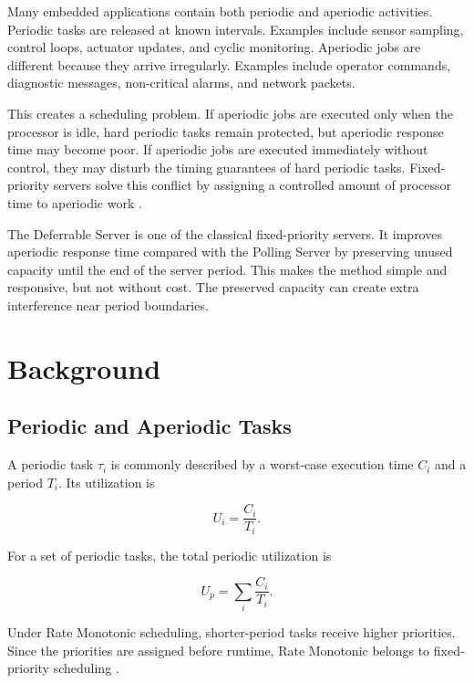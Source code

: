 \documentclass[conference]{IEEEtran}
\begin{document}
	Many embedded applications contain both periodic and aperiodic activities. Periodic tasks are released at known intervals. Examples include sensor sampling, control loops, actuator updates, and cyclic monitoring. Aperiodic jobs are different because they arrive irregularly. Examples include operator commands, diagnostic messages, non-critical alarms, and network packets.
	
	This creates a scheduling problem. If aperiodic jobs are executed only when the processor is idle, hard periodic tasks remain protected, but aperiodic response time may become poor. If aperiodic jobs are executed immediately without control, they may disturb the timing guarantees of hard periodic tasks. Fixed-priority servers solve this conflict by assigning a controlled amount of processor time to aperiodic work \cite{buttazzo2011}.
	
	The Deferrable Server is one of the classical fixed-priority servers. It improves aperiodic response time compared with the Polling Server by preserving unused capacity until the end of the server period. This makes the method simple and responsive, but not without cost. The preserved capacity can create extra interference near period boundaries.
	
	\section{Background}
	
	\subsection{Periodic and Aperiodic Tasks}
	
	A periodic task $\tau_i$ is commonly described by a worst-case execution time $C_i$ and a period $T_i$. Its utilization is
	
	\begin{equation}
		U_i = \frac{C_i}{T_i}.
	\end{equation}
	
	For a set of periodic tasks, the total periodic utilization is
	
	\begin{equation}
		U_p = \sum_i \frac{C_i}{T_i}.
	\end{equation}
	
	Under Rate Monotonic scheduling, shorter-period tasks receive higher priorities. Since the priorities are assigned before runtime, Rate Monotonic belongs to fixed-priority scheduling \cite{liu1973}.
	
\end{document}
